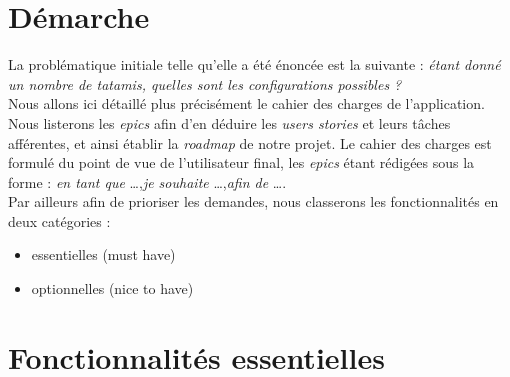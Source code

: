 \section{Démarche}

La problématique initiale telle qu'elle a été énoncée est la suivante : \emph{étant donné un nombre de tatamis, quelles sont les 
configurations possibles ?}\\


Nous allons ici détaillé plus précisément le cahier des charges de l'application. Nous listerons les \emph{epics} afin d'en déduire
les \emph{users stories} et leurs tâches afférentes, et ainsi établir la \emph{roadmap} de notre projet. Le cahier des charges est formulé 
du point de vue de l'utilisateur final, les \emph{epics} étant rédigées sous la forme : \emph{en tant que} \dots ,\emph{je souhaite} \dots ,\emph{afin de } \dots.\\


Par ailleurs afin de prioriser les demandes, nous classerons les fonctionnalités en deux catégories :

\begin{itemize}
    \item essentielles (must have)
    \item optionnelles (nice to have)
\end{itemize}

\section{Fonctionnalités essentielles}


